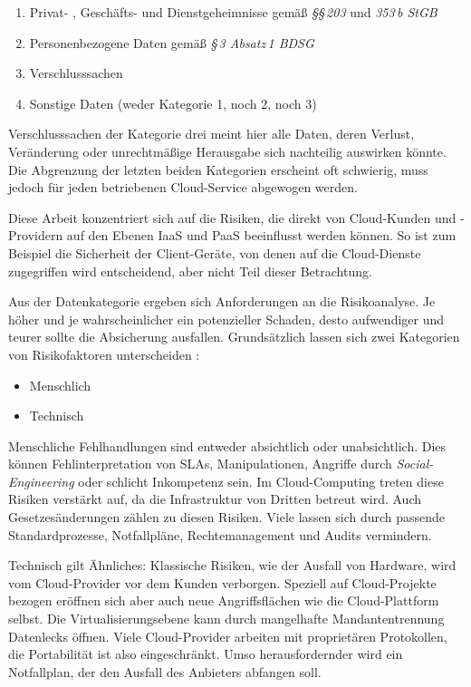 \begin{enumerate}
	\item Privat- , Geschäfts- und Dienstgeheimnisse gemäß \emph{§§\,203} und \emph{353\,b StGB}
	\item Personenbezogene Daten gemäß \emph{§\,3 Absatz\,1 BDSG}
	\item Verschlusssachen
	\item Sonstige Daten (weder Kategorie 1, noch 2, noch 3)	
\end{enumerate}

Verschlusssachen der Kategorie drei meint hier alle Daten, deren Verlust, Veränderung oder unrechtmäßige Herausgabe sich nachteilig auswirken könnte. Die Abgrenzung der letzten beiden Kategorien erscheint oft schwierig, muss jedoch für jeden betriebenen Cloud-Service abgewogen werden.

Diese Arbeit konzentriert sich auf die Risiken, die direkt von Cloud-Kunden und \mbox{-Providern} auf den Ebenen IaaS und PaaS beeinflusst werden können. So ist zum Beispiel die Sicherheit der Client-Geräte, von denen auf die Cloud-Dienste zugegriffen wird entscheidend, aber nicht Teil dieser Betrachtung.

Aus der Datenkategorie ergeben sich Anforderungen an die Risikoanalyse. Je höher und je wahrscheinlicher ein potenzieller Schaden, desto aufwendiger und teurer sollte die Absicherung ausfallen. Grundsätzlich lassen sich zwei Kategorien von Risikofaktoren unterscheiden \cite{monjur:2017:security-taxonomy}:

\begin{itemize}
	\item Menschlich
	\item Technisch
\end{itemize}

Menschliche Fehlhandlungen sind entweder absichtlich oder unabsichtlich. Dies können Fehlinterpretation von SLAs, Manipulationen, Angriffe durch \emph{Social-Engineering} oder schlicht Inkompetenz sein. Im Cloud-Computing treten diese Risiken verstärkt auf, da die Infrastruktur von Dritten betreut wird. Auch Gesetzesänderungen zählen zu diesen Risiken. Viele lassen sich durch passende Standardprozesse, Notfallpläne, Rechtemanagement und Audits vermindern.

Technisch gilt Ähnliches: Klassische Risiken, wie der Ausfall von Hardware, wird vom Cloud-Provider vor dem Kunden verborgen. Speziell auf Cloud-Projekte bezogen eröffnen sich aber auch neue Angriffsflächen wie die Cloud-Plattform selbst. Die Virtualisierungsebene kann durch mangelhafte Mandantentrennung Datenlecks öffnen. Viele Cloud-Provider arbeiten mit proprietären Protokollen, die Portabilität ist also eingeschränkt. Umso herausfordernder wird ein Notfallplan, der den Ausfall des Anbieters abfangen soll.

